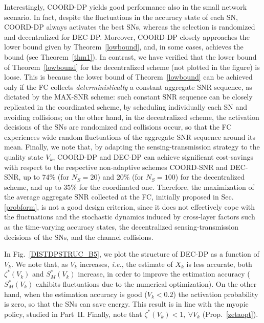 \documentclass[10pt,twocolumn,twoside]{IEEEtran}
\theoremstyle{plain}
\begin{document}
Interestingly, COORD-DP yields good performance also in the small network scenario.
In fact, despite the fluctuations in the accuracy state of each SN, COORD-DP always activates the
best SNs, whereas the selection is randomized and decentralized for DEC-DP.
Moreover, COORD-DP closely approaches the lower bound given by Theorem~\ref{lowbound},
and, in some cases, achieves the bound (see Theorem~\ref{thm1}). In contrast, we have verified that the lower bound of Theorem~\ref{lowbound}
for the decentralized scheme (not plotted in the figure) is loose.
This is because the lower bound of Theorem~\ref{lowbound} can be achieved only if the FC collects \emph{deterministically} a constant aggregate SNR sequence,
as dictated by the MAX-SNR scheme:
such  constant SNR sequence can be closely replicated in
 the coordinated scheme, by scheduling individually each SN and avoiding collisions; on the other hand, in the decentralized scheme, the activation decisions of the SNs are randomized and collisions occur, so that the FC experiences wide random fluctuations of
the aggregate SNR sequence around its mean.
Finally, we note that, by adapting the sensing-transmission strategy to the quality state $V_k$,
 COORD-DP and DEC-DP can achieve
 significant cost-savings
 with respect to the respective non-adaptive schemes COORD-SNR and DEC-SNR,
 up to 
74\% (for $N_S=20$) and 20\% (for $N_S=100$) for the decentralized scheme,
and up to 35\% for the coordinated one. Therefore, the maximization of the average aggregate SNR collected at the FC,
initially proposed in Sec. \ref{probform},
 is not a good design criterion,
since it does not effectively cope with the fluctuations and the stochastic dynamics
 induced by cross-layer factors such as the time-varying accuracy states, the decentralized sensing-transmission decisions of the SNs, and the channel collisions.
 



In Fig.~\ref{DISTDPSTRUC_B5}, we plot the structure of DEC-DP as a function of $V_k$.
We note that, as $V_k$ increases,
\emph{i.e.}, the estimate of $X_k$ is less accurate,
 both $\zeta^*(V_k)$ and $S_M^*(V_k)$ increase,
 in order to improve the estimation accuracy ($S_M^*(V_k)$ exhibits fluctuations due to the numerical optimization).
 On the other hand, when the estimation accuracy is good ($V_k<0.2$)
  the activation probability is zero, so that the SNs can
 save energy.
 This result is in line with the myopic policy, studied in Part~II.
 Finally, note that $\zeta^*(V_k)<1,\ \forall V_k$ (Prop.~\ref{zetaopt}).
\end{document}
